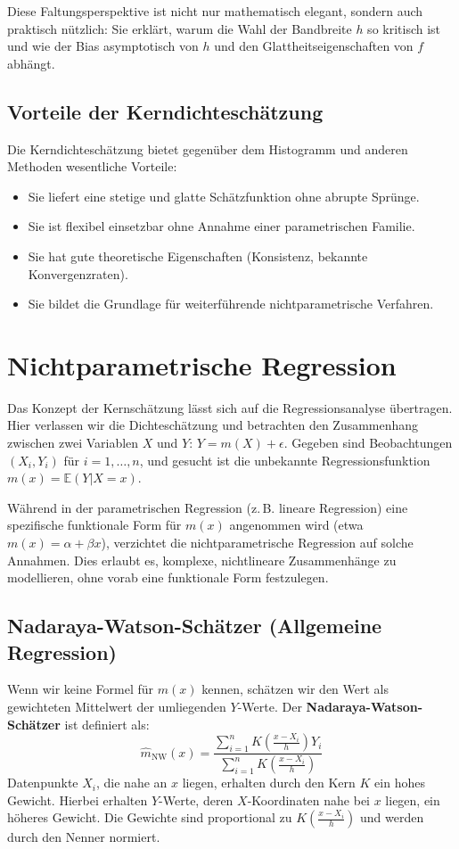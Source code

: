 \documentclass[a4paper, 11pt]{scrartcl}
\begin{document}
Diese Faltungsperspektive ist nicht nur mathematisch elegant, sondern auch praktisch nützlich: Sie erklärt, warum die Wahl der Bandbreite $h$ so kritisch ist und wie der Bias asymptotisch von $h$ und den Glattheitseigenschaften von $f$ abhängt.

\subsection{Vorteile der Kerndichteschätzung}

Die Kerndichteschätzung bietet gegenüber dem Histogramm und anderen Methoden wesentliche Vorteile:
\begin{itemize}
	\item Sie liefert eine stetige und glatte Schätzfunktion ohne abrupte Sprünge.
	\item Sie ist flexibel einsetzbar ohne Annahme einer parametrischen Familie.
	\item Sie hat gute theoretische Eigenschaften (Konsistenz, bekannte Konvergenzraten).
	\item Sie bildet die Grundlage für weiterführende nichtparametrische Verfahren.
\end{itemize}

\section{Nichtparametrische Regression}

Das Konzept der Kernschätzung lässt sich auf die Regressionsanalyse übertragen. Hier verlassen wir die Dichteschätzung und betrachten den Zusammenhang zwischen zwei Variablen $X$ und $Y$: $Y = m(X) + \epsilon$. Gegeben sind Beobachtungen $(X_i, Y_i)$ für $i = 1, \ldots, n$, und gesucht ist die unbekannte Regressionsfunktion $m(x) = \mathbb{E}(Y|X=x)$.

Während in der parametrischen Regression (z.\,B. lineare Regression) eine spezifische funktionale Form für $m(x)$ angenommen wird (etwa $m(x) = \alpha + \beta x$), verzichtet die nichtparametrische Regression auf solche Annahmen. Dies erlaubt es, komplexe, nichtlineare Zusammenhänge zu modellieren, ohne vorab eine funktionale Form festzulegen.

\subsection{Nadaraya-Watson-Schätzer (Allgemeine Regression)}

Wenn wir keine Formel für $m(x)$ kennen, schätzen wir den Wert als gewichteten Mittelwert der umliegenden $Y$-Werte. Der \textbf{Nadaraya-Watson-Schätzer} \cite{NadarayaWatson1964, Watson1964} ist definiert als:
\begin{equation}
	\hat{m}_{\text{NW}}(x) = \frac{\sum_{i=1}^n K\left(\frac{x - X_i}{h}\right) Y_i}{\sum_{i=1}^n K\left(\frac{x - X_i}{h}\right)}
\end{equation}
Datenpunkte $X_i$, die nahe an $x$ liegen, erhalten durch den Kern $K$ ein hohes Gewicht. Hierbei erhalten $Y$-Werte, deren $X$-Koordinaten nahe bei $x$ liegen, ein höheres Gewicht. Die Gewichte sind proportional zu $K\left(\frac{x - X_i}{h}\right)$ und werden durch den Nenner normiert.
\end{document}
